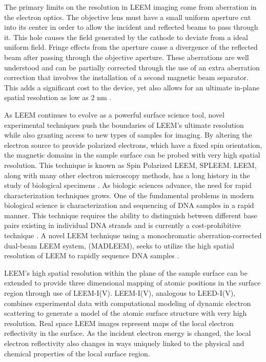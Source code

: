 	The primary limits on the resolution in LEEM imaging come from aberration in the electron optics. The objective lens must have a small uniform aperture cut into its center in order to allow the incident and reflected beams to pass through it. This hole causes the field generated by the cathode to deviate from a ideal uniform field. Fringe effects from the aperture cause a divergence of the reflected beam after passing through the objective aperture. These aberrations are well understood and can be partially corrected through the use of an extra aberration correction that involves the installation of a second magnetic beam separator. This adds a significant cost to the device, yet also allows for an ultimate in-plane spatial resolution as low as 2 nm \cite{Hannon-LEEM-Book, Figuera-LEEM}. 

As LEEM continues to evolve as a powerful surface science tool, novel experimental techniques push the boundaries of LEEM's ultimate resolution while also granting access to new types of samples for imaging. By altering the electron source to provide polarized electrons, which have a fixed spin orientation, the magnetic domains in the sample surface can be probed with very high spatial resolution. This technique is known as Spin Polarized LEEM, SPLEEM. LEEM, along with many other electron microscopy methods, has a long history in the study of biological specimens \cite{Bauer-LEEM}. As biologic sciences advance, the need for rapid characterization techniques grows. One of the fundamental problems in modern biological science is characterization and sequencing of DNA samples in a rapid manner. This technique requires the ability to distinguish between different base pairs existing in individual DNA strands and is currently a cost-prohibitive technique \cite{MADLEEM}. A novel LEEM technique using a monochromatic aberration-corrected dual-beam LEEM system, (MADLEEM), seeks to utilize the high spatial resolution of LEEM to rapidly sequence DNA samples \cite{MADLEEM}.

LEEM's high spatial resolution within the plane of the sample surface can be extended to provide three dimensional mapping of atomic positions in the surface region through use of LEEM-I(V). LEEM-I(V), analogous to LEED-I(V), combines experimental data with computational modeling of dynamic electron scattering to generate a model of the atomic surface structure with very high resolution. Real space LEEM images represent maps of the local electron reflectivity in the surface. As the incident electron energy is changed, the local electron reflectivity also changes in ways uniquely linked to the physical and chemical properties of the local surface region.

